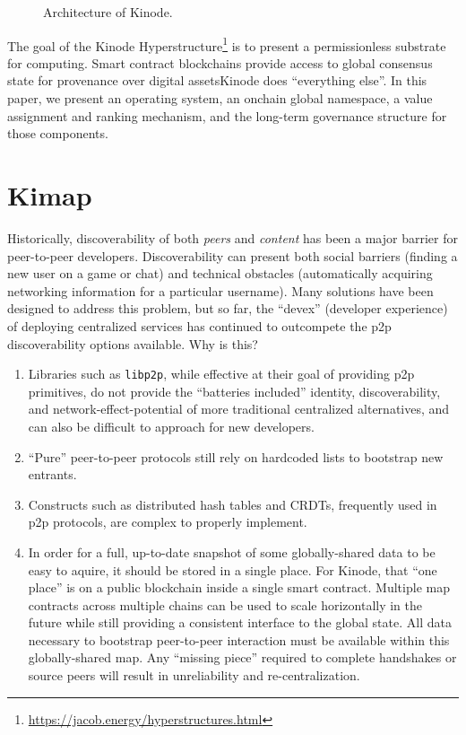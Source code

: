 \documentclass[runningheads]{llncs}
\begin{document}
\begin{figure}[H]
    \centering
    \caption{Architecture of Kinode.}
    \label{fig:triangle}
\end{figure}

The goal of the Kinode Hyperstructure\footnote{\url{https://jacob.energy/hyperstructures.html}}
is to present a permissionless substrate for computing.
Smart contract blockchains provide access to global consensus state for provenance over digital assets\textemdash Kinode does ``everything else''.
In this paper, we present an operating system, an onchain global namespace, a value assignment and ranking mechanism, and the long-term governance structure for those components.

\section{Kimap}
\label{sec:kimap}

Historically, discoverability of both \textit{peers} and \textit{content} has been a major barrier for peer-to-peer developers.
Discoverability can present both social barriers (finding a new user on a game or chat) and technical obstacles (automatically acquiring networking information for a particular username).
Many solutions have been designed to address this problem, but so far, the ``devex'' (developer experience) of deploying centralized services has continued to outcompete the p2p discoverability options available.
Why is this?
\begin{enumerate}
    \item Libraries such as \verb|libp2p|, while effective at their goal of providing p2p primitives, do not provide the ``batteries included'' identity, discoverability, and network-effect-potential of more traditional centralized alternatives, and can also be difficult to approach for new developers.
    \item ``Pure'' peer-to-peer protocols still rely on hardcoded lists to bootstrap new entrants.
    \item Constructs such as distributed hash tables and CRDTs, frequently used in p2p protocols, are complex to properly implement.
    \item In order for a full, up-to-date snapshot of some globally-shared data to be easy to aquire, it should be stored in a single place.
    \subitem For Kinode, that ``one place'' is on a public blockchain inside a single smart contract.
    \subitem Multiple map contracts across multiple chains can be used to scale horizontally in the future while still providing a consistent interface to the global state.
    \subitem All data necessary to bootstrap peer-to-peer interaction must be available within this globally-shared map.
    \subitem Any ``missing piece'' required to complete handshakes or source peers will result in unreliability and re-centralization.
\end{enumerate}
\end{document}
